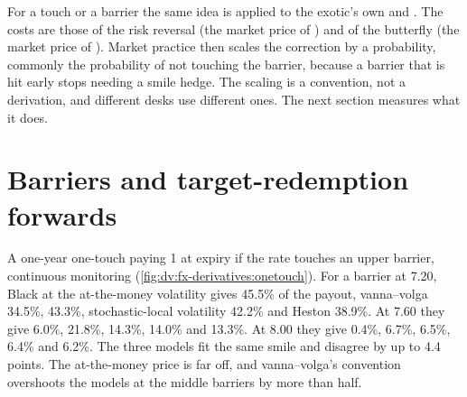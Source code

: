 For a touch or a barrier the same idea is applied to the exotic's own  and . The costs are those of the risk reversal (the
market price of ) and of the butterfly (the market price of ). Market practice then scales the correction by a probability,
commonly the probability of not touching the barrier, because a barrier that is hit early stops needing a smile hedge. The scaling is
a convention, not a derivation, and different desks use different ones. The next section measures what it does.

\section{Barriers and target-redemption forwards}

\begin{example}\label{ex:dv:fx-derivatives:onetouch}
A one-year one-touch paying 1 at expiry if the rate touches an upper barrier, continuous monitoring (\cref{fig:dv:fx-derivatives:onetouch}).
For a barrier at 7.20, Black at the at-the-money volatility gives 45.5\% of the payout, vanna--volga 34.5\%,  43.3\%,
stochastic-local volatility 42.2\% and Heston 38.9\%. At 7.60 they give 6.0\%, 21.8\%, 14.3\%, 14.0\% and 13.3\%. At 8.00 they give 0.4\%,
6.7\%, 6.5\%, 6.4\% and 6.2\%. The three models fit the same smile and disagree by up to 4.4 points. The at-the-money price is far off,
and vanna--volga's convention overshoots the models at the middle barriers by more than half.
\end{example}

